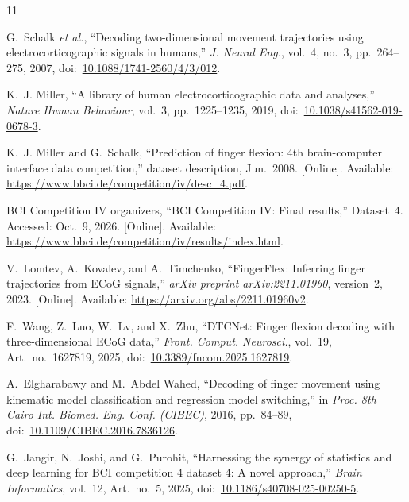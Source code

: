\clearpage
{}
\begin{thebibliography}{11}
\raggedright

G.~Schalk \emph{et al.}, ``Decoding two-dimensional movement trajectories using electrocorticographic signals in humans,'' \emph{J. Neural Eng.}, vol.~4, no.~3, pp.~264--275, 2007, doi:~\href{https://doi.org/10.1088/1741-2560/4/3/012}{10.1088/1741-2560/4/3/012}.

K.~J. Miller, ``A library of human electrocorticographic data and analyses,'' \emph{Nature Human Behaviour}, vol.~3, pp.~1225--1235, 2019, doi:~\href{https://doi.org/10.1038/s41562-019-0678-3}{10.1038/s41562-019-0678-3}.

K.~J. Miller and G.~Schalk, ``Prediction of finger flexion: 4th brain-computer interface data competition,'' dataset description, Jun.~2008. [Online]. Available: \url{https://www.bbci.de/competition/iv/desc_4.pdf}.

BCI Competition IV organizers, ``BCI Competition IV: Final results,'' Dataset~4. Accessed: Oct.~9, 2026. [Online]. Available: \url{https://www.bbci.de/competition/iv/results/index.html}.

V.~Lomtev, A.~Kovalev, and A.~Timchenko, ``FingerFlex: Inferring finger trajectories from ECoG signals,'' \emph{arXiv preprint arXiv:2211.01960}, version~2, 2023. [Online]. Available: \url{https://arxiv.org/abs/2211.01960v2}.

F.~Wang, Z.~Luo, W.~Lv, and X.~Zhu, ``DTCNet: Finger flexion decoding with three-dimensional ECoG data,'' \emph{Front. Comput. Neurosci.}, vol.~19, Art.~no.~1627819, 2025, doi:~\href{https://doi.org/10.3389/fncom.2025.1627819}{10.3389/fncom.2025.1627819}.

A.~Elgharabawy and M.~Abdel Wahed, ``Decoding of finger movement using kinematic model classification and regression model switching,'' in \emph{Proc. 8th Cairo Int. Biomed. Eng. Conf. (CIBEC)}, 2016, pp.~84--89, doi:~\href{https://doi.org/10.1109/CIBEC.2016.7836126}{10.1109/CIBEC.2016.7836126}.

G.~Jangir, N.~Joshi, and G.~Purohit, ``Harnessing the synergy of statistics and deep learning for BCI competition 4 dataset 4: A novel approach,'' \emph{Brain Informatics}, vol.~12, Art.~no.~5, 2025, doi:~\href{https://doi.org/10.1186/s40708-025-00250-5}{10.1186/s40708-025-00250-5}.


\end{thebibliography}
